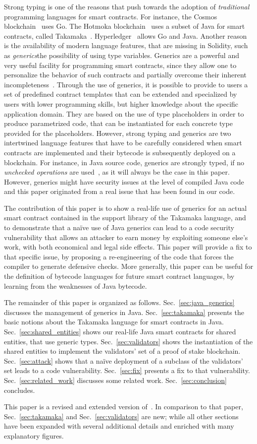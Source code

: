 Strong typing is one of the reasons that push towards the adoption
of \emph{traditional} programming languages for smart contracts. For instance,
the Cosmos blockchain~\cite{cosmos} uses Go. The
Hotmoka blockchain~\cite{hotmoka} uses a subset of Java
for smart contracts, called Takamaka~\cite{Spoto19,Spoto20}.
Hyperledger~\cite{hyperldeger} allows Go and Java.
Another reason is the availability of modern
language features, that are missing in Solidity,
such as \emph{generics}\ie the possibility of using
type variables. Generics are a powerful and very useful facility for programming
smart contracts, since they allow one to personalize the behavior of such contracts and partially overcome their inherent incompleteness~\cite{ebp}. 
%
Through the use of generics, it is possible to provide to users a set of predefined contract templates that can be extended and specialized by users with lower programming skills, but higher knowledge about the specific application domain. They are based on the use of type placeholders in order
to produce parametrized code, that can be instantiated for each
concrete type provided for the placeholders.
%
However, strong typing and generics are two intertwined language features that have to be carefully considered when smart contracts are implemented and their bytecode is subsequently deployed on a blockchain. For instance, in Java source code, generics are strongly typed, if no \emph{unchecked operations} are used~\cite{NaftalinW06}, as it will always be the case in this paper.
However, generics might have security issues at the level of compiled Java code and this paper originated from a real issue that has been found in our code.



The contribution of this paper is to show a real-life
use of generics for an actual smart contract contained in the support
library of the Takamaka language, and to demonstrate that a na\"{i}ve use
of Java generics can lead to a code security vulnerability that
allows an attacker to earn money by exploiting someone else's work, with both economical and legal side effects.
This paper will provide a fix to that specific issue,
by proposing a re-engineering of the code that forces the compiler to generate defensive checks.
More generally, this paper can be useful for the definition of
bytecode languages for future smart contract languages, by
learning from the weaknesses of Java bytecode.

The remainder of this paper is organized as follows.
Sec.~\ref{sec:java_generics} discusses the management of generics in Java.
Sec.~\ref{sec:takamaka} presents the basic notions about the Takamaka language for smart contracts in Java.
Sec.~\ref{sec:shared_entities} shows our real-life Java smart
contracts for shared entities, that use generic types.
Sec.~\ref{sec:validators} shows the instantiation of the shared entities to implement the validators' set
of a proof of stake blockchain.
Sec.~\ref{sec:attack} shows that a na\"{i}ve
deployment of a subclass of the validators' set leads to a code vulnerability.
Sec.~\ref{sec:fix} presents a fix to that vulnerability.
Sec.~\ref{sec:related_work} discusses some related work.
Sec.~\ref{sec:conclusion} concludes.

This paper is a revised and extended version of~\cite{BeniniGMS21}.
In comparison to that paper, Sec.~\ref{sec:takamaka} and
Sec.~\ref{sec:validators} are new; while all other sections have been expanded with several additional details and enriched with many explanatory figures.
